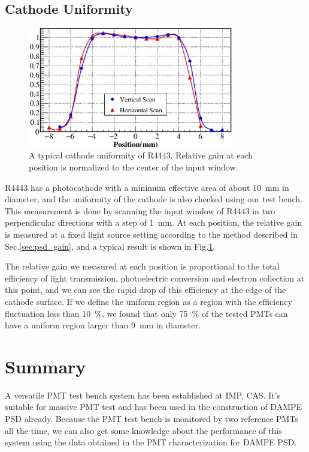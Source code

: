 \documentclass[preprint, times]{elsarticle}
\begin{document}
\subsection{Cathode Uniformity}
\label{sec:psd_cathodescan}

\begin{figure}
 \centering
 \includegraphics[width=90mm]{FIG12}
\caption{A typical cathode uniformity of R4443.
Relative gain at each position is normalized to the center of the input window.}
\label{fig:FIG12}
\end{figure} 

R4443 has a photocathode with a minimum effective area of about \SI{10}{\milli\meter} in diameter, and the uniformity of the cathode is also checked using our test bench.
This measurement is done by scanning the input window of R4443 in two perpendicular directions with a step of \SI{1}{\milli\meter}.
At each position, the relative gain is measured at a fixed light source setting according to the method described in Sec.\ref{sec:psd_gain}, and a typical result is shown in Fig.\ref{fig:FIG12}.

The relative gain we measured at each position is proportional to the total efficiency of light transmission, photoelectric conversion and electron collection at this point, and we can see the rapid drop of this efficiency at the edge of the cathode surface. 
If we define the uniform region as a region with the efficiency fluctuation less than \SI{10}{\percent}, we found that only \SI{75}{\percent} of the tested PMTs can have a uniform region larger than \SI{9}{\milli\meter} in diameter. 

\section{Summary}
\label{sec:summary}

A versatile PMT test bench system has been established at IMP, CAS. It's suitable for massive PMT test and has been used in the construction of DAMPE PSD already. Because the PMT test bench is monitored by two reference PMTs all the time, we can also get some knowledge about the performance of this system using the data obtained in the PMT characterization for DAMPE PSD.
\end{document}
